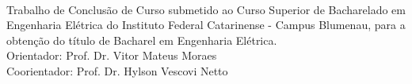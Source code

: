 \newpage %
\thispagestyle{empty} %
\clearpage %

\begin{center} %
    \Autor %

    \vspace{270pt} %

    \textbf{\Titulo} %
    \\
    \Subtitulo %
\end{center}

\vspace{100pt} %

\begin{flushright} %
    \begin{minipage}[t]{8cm} %

        Trabalho de Conclusão de Curso submetido ao Curso Superior de Bacharelado em Engenharia Elétrica do Instituto Federal Catarinense - Campus Blumenau, para a obtenção do título de Bacharel em Engenharia Elétrica.
        \\
        Orientador: Prof. Dr. Vitor Mateus Moraes
        \\
        Coorientador: Prof. Dr. Hylson Vescovi Netto

    \end{minipage}
\end{flushright}

\vfill %
\begin{center} %
    \Cidade %
    \\
    \Data %
\end{center}

\thispagestyle{empty} %
\clearpage %

